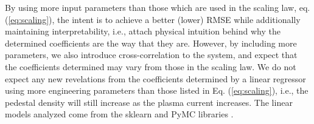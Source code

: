 \documentclass[a4paper, twoside, final, 12pt]{article}
\begin{document}

By using more input parameters than those which are used in the scaling law, eq. (\ref{eq:scaling}), the intent is to achieve a better (lower) RMSE while additionally maintaining interpretability, i.e., attach physical intuition behind why the determined coefficients are the way that they are. However, by including more parameters, we also introduce cross-correlation to the system, and expect that the coefficients determined may vary from those in the scaling law. We do not expect any new revelations from the coefficients determined by a linear regressor using more engineering parameters than those listed in Eq. (\ref{eq:scaling}), i.e., the pedestal density will still increase as the plasma current increases.  The linear models analyzed come from the sklearn and PyMC libraries \cite{scikit-learn, Salvatier2016}. 
\end{document}
